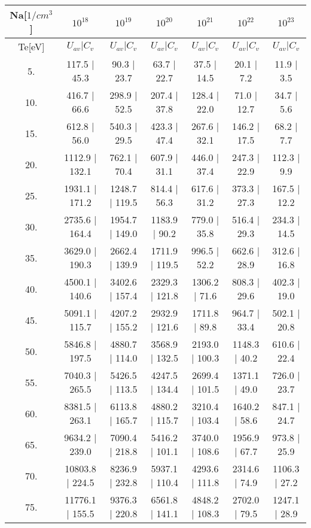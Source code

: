 \begin{tabular}{|c||c|c|c|c|c|c|}
\hline
Na[$1/cm^3$] & $10^{18}$ & $10^{19}$ & $10^{20}$ & $10^{21}$ & $10^{22}$ & $10^{23}$\tabularnewline
\hline
Te[eV] & $U_{av} | C_v$ & $U_{av} | C_v$ & $U_{av} | C_v$ & $U_{av} | C_v$ & $U_{av} | C_v$ & $U_{av} | C_v$\tabularnewline
\hline
\hline
   5. &    117.5 |    45.3 &     90.3 |    23.7 &     63.7 |    22.7 &     37.5 |    14.5 &     20.1 |     7.2 &     11.9 |     3.5\tabularnewline
\hline
  10. &    416.7 |    66.6 &    298.9 |    52.5 &    207.4 |    37.8 &    128.4 |    22.0 &     71.0 |    12.7 &     34.7 |     5.6\tabularnewline
\hline
  15. &    612.8 |    56.0 &    540.3 |    29.5 &    423.3 |    47.4 &    267.6 |    32.1 &    146.2 |    17.5 &     68.2 |     7.7\tabularnewline
\hline
  20. &   1112.9 |   132.1 &    762.1 |    70.4 &    607.9 |    31.1 &    446.0 |    37.4 &    247.3 |    22.9 &    112.3 |     9.9\tabularnewline
\hline
  25. &   1931.1 |   171.2 &   1248.7 |   119.5 &    814.4 |    56.3 &    617.6 |    31.2 &    373.3 |    27.3 &    167.5 |    12.2\tabularnewline
\hline
  30. &   2735.6 |   164.4 &   1954.7 |   149.0 &   1183.9 |    90.2 &    779.0 |    35.8 &    516.4 |    29.3 &    234.3 |    14.5\tabularnewline
\hline
  35. &   3629.0 |   190.3 &   2662.4 |   139.9 &   1711.9 |   119.5 &    996.5 |    52.2 &    662.6 |    28.9 &    312.6 |    16.8\tabularnewline
\hline
  40. &   4500.1 |   140.6 &   3402.6 |   157.4 &   2329.3 |   121.8 &   1306.2 |    71.6 &    808.3 |    29.6 &    402.3 |    19.0\tabularnewline
\hline
  45. &   5091.1 |   115.7 &   4207.2 |   155.2 &   2932.9 |   121.6 &   1711.8 |    89.8 &    964.7 |    33.4 &    502.1 |    20.8\tabularnewline
\hline
  50. &   5846.8 |   197.5 &   4880.7 |   114.0 &   3568.9 |   132.5 &   2193.0 |   100.3 &   1148.3 |    40.2 &    610.6 |    22.4\tabularnewline
\hline
  55. &   7040.3 |   265.5 &   5426.5 |   113.5 &   4247.5 |   134.4 &   2699.4 |   101.5 &   1371.1 |    49.0 &    726.0 |    23.7\tabularnewline
\hline
  60. &   8381.5 |   263.1 &   6113.8 |   165.7 &   4880.2 |   115.7 &   3210.4 |   103.4 &   1640.2 |    58.6 &    847.1 |    24.7\tabularnewline
\hline
  65. &   9634.2 |   239.0 &   7090.4 |   218.8 &   5416.2 |   101.1 &   3740.0 |   108.6 &   1956.9 |    67.7 &    973.8 |    25.9\tabularnewline
\hline
  70. &  10803.8 |   224.5 &   8236.9 |   232.8 &   5937.1 |   110.4 &   4293.6 |   111.8 &   2314.6 |    74.9 &   1106.3 |    27.2\tabularnewline
\hline
  75. &  11776.1 |   155.5 &   9376.3 |   220.8 &   6561.8 |   141.1 &   4848.2 |   108.3 &   2702.0 |    79.5 &   1247.1 |    28.9\tabularnewline

\end{tabular}
